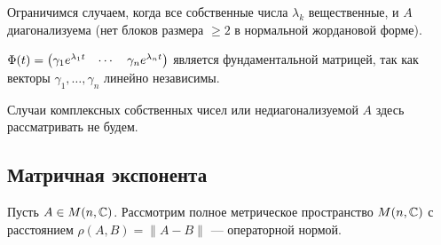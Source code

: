 \documentclass[a4paper]{report}
\begin{document}
    Ограничимся случаем, когда все собственные числа $\lambda_k$ вещественные, и $A$ диагонализуема (нет блоков размера $\ge 2$ в нормальной жордановой форме).

    $\Phi(t) = \begin{pmatrix}\gamma_1 e^{\lambda_1 t} & \cdots & \gamma_n e^{\lambda_n t}\end{pmatrix}$ является фундаментальной матрицей, так как векторы $\gamma_1, \dots, \gamma_n$ линейно независимы.

    Случаи комплексных собственных чисел или недиагонализуемой $A$ здесь рассматривать не будем.

    \subsection{Матричная экспонента}
    Пусть $A \in M(n, \mathbb{C})$.
    Рассмотрим полное метрическое пространство $M(n, \mathbb{C})$ с расстоянием $\rho(A, B) = \|A - B\|$ --- операторной нормой.
\end{document}
